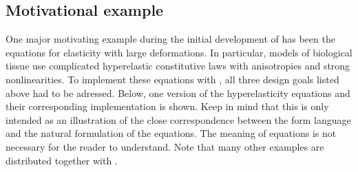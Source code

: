 \subsection{Motivational example} \label{ufl:sec:example}
One major motivating example during the initial development of \ufl{}
has been the equations for elasticity with large deformations.  In
particular, models of biological tissue use complicated hyperelastic
constitutive laws with anisotropies and strong nonlinearities.  To
implement these equations with \fenics{}, all three design goals
listed above had to be adressed.  Below, one version of the
hyperelasticity equations and their corresponding \ufl{}
implementation is shown.  Keep in mind that this is only intended as
an illustration of the close correspondence between the form language
and the natural formulation of the equations.  The meaning of
equations is not necessary for the reader to understand.  Note that
many other examples are distributed together with \ufl{}.

